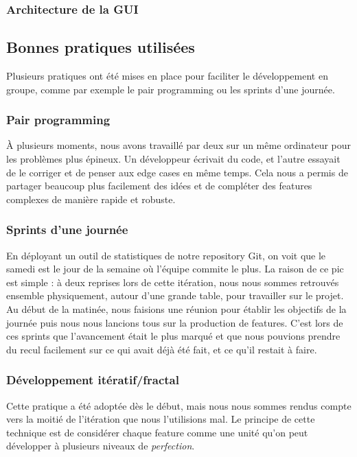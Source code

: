 	\subsubsection{Architecture de la GUI}

\subsection{Bonnes pratiques utilisées}
Plusieurs pratiques ont été mises en place pour faciliter le développement en 
groupe, comme par exemple le pair programming ou les sprints d'une journée.

	\subsubsection{Pair programming}
	\`A plusieurs moments, nous avons travaillé par deux sur un même ordinateur pour
	les problèmes plus épineux. Un développeur écrivait du code, et l'autre essayait
	de le corriger et de penser aux edge cases en même temps. Cela nous a permis de 
	partager beaucoup plus facilement des idées et de compléter des features
	complexes de manière rapide et robuste.

	\subsubsection{Sprints d'une journée}
	En déployant un outil de statistiques de notre repository Git, on voit que le 
	samedi est le jour de la semaine où l'équipe commite le plus. La raison de ce 
	pic est simple : à deux reprises lors de cette itération, nous nous sommes
	retrouvés ensemble physiquement, autour d'une grande table, pour travailler sur
	le projet. \\

	Au début de la matinée, nous faisions une réunion pour établir les
	objectifs de la journée puis nous nous lancions tous sur la production de
	features. C'est lors de ces sprints que l'avancement était le plus marqué et 
	que nous pouvions prendre du recul facilement sur ce qui avait déjà été fait, 
	et ce qu'il restait à faire.

	\subsubsection{Développement itératif/fractal}
	Cette pratique a été adoptée dès le début, mais nous nous sommes rendus compte
	vers la moitié de l'itération que nous l'utilisions mal. Le principe de cette
	technique est de considérer chaque feature comme une unité qu'on peut développer
	à plusieurs niveaux de \textit{perfection}. \\

